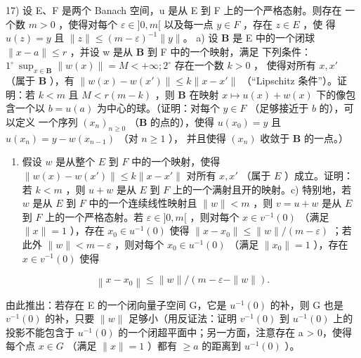 17) 设 E、F 是两个 Banach 空间，u 是从 E 到 F 上的一个严格态射。则存在
一个数 \(m > 0\) ，使得对每个 \(\varepsilon \in ]0, m[\) 以及每一点 \(y \in F\) ，存在 \(z \in E\) ，使
得 \(u(z) = y\) 且 \(\| z \| \leqslant (m - \varepsilon)^{-1} \| y \|\)。
a) 设 \(\mathbf{B}\) 是 E 中的一个闭球 \(\| x - a \| \leqslant r\) ，并设 w 是从 \(\mathbf{B}\) 到 F 中的一个映射，满足
下列条件：\(1^{\circ}\ \sup_{x \in \mathbf{B}} \| w(x) \| = M < +\infty; 2^{\circ}\) 存在一个数 \(k > 0\) ，
使得对所有 \(x, x'\) （属于 \(\mathbf{B}\) ），有 \(\| w(x) - w(x') \| \leqslant k \| x - x' \|\) （“Lipschitz 条件”）。证明：若 \(k < m\) 且 \(M < r(m - k)\) ，则 \(\mathbf{B}\) 在映射 \(x \mapsto u(x) + w(x)\)
下的像包含一个以 \(b = u(a)\) 为中心的球。（证明：对每个 \(y \in F\) （足够接近于 \(b\) 的），可以定义
一个序列 \((x_n)_{n \geqslant 0}\) （\(\mathbf{B}\) 的点的），使得 \(u(x_0) = y\) 且 \(u(x_n) = y - w(x_{n-1})\) （对 \(n \geqslant 1\) ），
并且使得 \((x_n)\) 收敛于 \(\mathbf{B}\) 的一点。）


\begin{enumerate}
\def\labelenumi{\alph{enumi})}
\setcounter{enumi}{1}
\tightlist
\item
  假设 \(w\) 是从整个 \(E\) 到 \(F\) 中的一个映射，使得 \(\| w(x) - w(x') \| \leqslant k \| x - x' \|\) 对所有 \(x, x'\) （属于 \(E\) ）成立。证明：若 \(k < m\) ，则 \(u + w\) 是从 \(E\) 到 \(F\) 上的一个满射且开的映射。c) 特别地，若 \(w\) 是从 \(E\) 到 \(F\) 中的一个连续线性映射且 \(\| w \| < m\) ，则 \(v = u + w\) 是从 \(E\) 到 \(F\) 上的一个严格态射。若 \(\varepsilon \in ]0, m[\) ，则对每个 \(x \in v^{-1}(0)\) （满足 \(\| x \| = 1\) ），存在 \(x_0 \in u^{-1}(0)\) 使得 \(\| x - x_0 \| \leqslant \| w \| / (m - \varepsilon)\) ；若此外 \(\| w \| < m - \varepsilon\) ，则对每个 \(x_0 \in u^{-1}(0)\) （满足 \(\| x_0 \| = 1\) ），存在 \(x \in v^{-1}(0)\) 使得
\end{enumerate}

\[
\left\| x - x _ {0} \right\| \leqslant \| w \| / (m - \varepsilon - \| w \|).
\]

由此推出：若存在 E 的一个闭向量子空间 G，它是 \(u^{-1}(0)\) 的补，则 G 也是 \(v^{-1}(0)\) 的补，只要 \(\|w\|\) 足够小（用反证法：证明 \(v^{-1}(0)\) 到 \(u^{-1}(0)\) 上的投影不能包含于 \(u^{-1}(0)\) 的一个闭超平面中；另一方面，注意存在 a > 0，使得每个点 \(x \in G\) （满足 \(\|x\| = 1\) ）都有 \(\geqslant a\) 的距离到 \(u^{-1}(0)\) ）。

